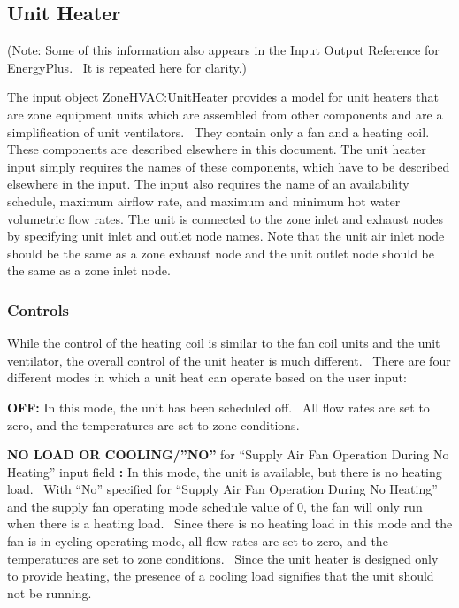 \subsection{Unit Heater}\label{unit-heater}

(Note: Some of this information also appears in the Input Output Reference for EnergyPlus.~ It is repeated here for clarity.)

The input object ZoneHVAC:UnitHeater provides a model for unit heaters that are zone equipment units which are assembled from other components and are a simplification of unit ventilators.~ They contain only a fan and a heating coil. These components are described elsewhere in this document. The unit heater input simply requires the names of these components, which have to be described elsewhere in the input. The input also requires the name of an availability schedule, maximum airflow rate, and maximum and minimum hot water volumetric flow rates. The unit is connected to the zone inlet and exhaust nodes by specifying unit inlet and outlet node names. Note that the unit air inlet node should be the same as a zone exhaust node and the unit outlet node should be the same as a zone inlet node.

\subsubsection{Controls}\label{controls-1-000}

While the control of the heating coil is similar to the fan coil units and the unit ventilator, the overall control of the unit heater is much different.~ There are four different modes in which a unit heat can operate based on the user input:

\textbf{OFF:} In this mode, the unit has been scheduled off.~ All flow rates are set to zero, and the temperatures are set to zone conditions.

\textbf{NO LOAD OR COOLING/''NO''} for ``Supply Air Fan Operation During No Heating'' input field \textbf{:} In this mode, the unit is available, but there is no heating load.~ With ``No'' specified for ``Supply Air Fan Operation During No Heating'' and the supply fan operating mode schedule value of 0, the fan will only run when there is a heating load.~ Since there is no heating load in this mode and the fan is in cycling operating mode, all flow rates are set to zero, and the temperatures are set to zone conditions.~ Since the unit heater is designed only to provide heating, the presence of a cooling load signifies that the unit should not be running.

